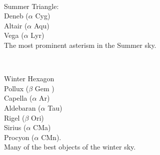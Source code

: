 \begin{frame}{\insertsubsubsectionhead}
  \begin{columns}[T,onlytextwidth]

    \centering

    \ \\
    \Large Summer Triangle: \\[1ex]
    \large
    Deneb ($\alpha$ Cyg)\\
    Altair ($\alpha$ Aqu)\\
    Vega ($\alpha$ Lyr)\\
    The most prominent asterism in the Summer sky.
    
  \end{columns}
\end{frame}


\begin{frame}{\insertsubsubsectionhead}
  \begin{columns}[T,onlytextwidth]

    \centering

    \ \\
    \Large Winter Hexagon \\[1ex]
    \large
     Pollux ($\beta$ Gem )\\
     Capella ($\alpha$ Ar)\\
     Aldebaran ($\alpha$ Tau)\\
     Rigel ($\beta$ Ori)\\
     Sirius ($\alpha$ CMa)\\
     Procyon ($\alpha$ CMn).\\
    Many of the best objects of the winter sky.
    
  \end{columns}
\end{frame}


